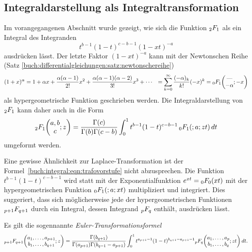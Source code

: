 %
%
\subsection{Integraldarstellung als Integraltransformation}
Im vorangegangenen Abschnitt wurde gezeigt, wie sich die Funktion
$\mathstrut_2F_1$ als ein Integral des Integranden
\[
t^{b-1}(1-t)^{c-b-1} (1-xt)^{-a}
\]
ausdrücken lässt.
Der letzte Faktor $(1-xt)^{-a}$ kann mit der
Newtonschen Reihe
(Satz \ref{buch:differentialgleichungen:satz:newtonschereihe})
\begin{align*}
(1+x)^\alpha
&=
1
+ 
\alpha x
+
\frac{\alpha(\alpha-1)}{2!}x^2
+
\frac{\alpha(\alpha-1)(\alpha-2)}{3!}x^3
+
\cdots
&=
\sum_{k=0}^\infty \frac{(-\alpha)_k}{k!} (-x)^k
=
\mathstrut_0F_1\biggl(
\begin{matrix}
\text{---}\\-\alpha
\end{matrix}
;-x
\biggr)
\end{align*}
als hypergeometrische Funktion geschrieben werden.
Die Integraldarstellung von $\mathstrut_2F_1$ kann daher auch 
in die Form
\begin{equation}
\mathstrut_2F_1\biggl(\begin{matrix}a,b\\c\end{matrix};z\biggr)
=
\frac{\Gamma(c)}{\Gamma(b)\Gamma(c-b)}
\int_0^1 t^{b-1}(1-t)^{c-b-1}
\,
\mathstrut_0F_1(;a;zt)\,dt
\label{buch:integral:eqn:trafovorstufe}
\end{equation}
umgeformt werden.

Eine gewisse Ähnlichkeit zur Laplace-Transformation ist der
Formel~\eqref{buch:integral:eqn:trafovorstufe} nicht abzusprechen.
Die Funktion \( t^{b-1}(1-t)^{c-b-1} \) wird statt mit der
Exponentialfunktion $e^{xt} = \mathstrut_0F_0(xt)$ mit der
hypergeometrischen Funktion $\mathstrut_0F_1(;a;xt)$ multipliziert und
integriert.
Dies suggeriert, dass sich möglicherweise jede der hypergeometrischen
Funktionen $\mathstrut_{p+1}F_{q+1}$ durch ein Integral, dessen 
Integrand $\mathstrut_pF_q$ enthält, ausdrücken lässt.

\begin{satz}
%
Es gilt die sogennannte {\em Euler-Transformationsformel}
%
\[
\mathstrut_{p+1}F_{q+1}\biggl(
\begin{matrix}
a_1,\dots,a_{p+1}\\
b_1,\dots,b_{q+1}
\end{matrix}
;z
\biggr)
=
\frac{\Gamma(b_{q+1})}{\Gamma(a_{p+1})\Gamma(b_{q-1}-a_{p+1})}
\int_0^1
t^{a_{p+1}-1}(1-t)^{b_{q+1}-a_{p+1}-1}
\mathstrut_pF_q\biggl(
\begin{matrix}
a_1,\dots,a_p\\
b_1,\dots,b_q
\end{matrix};zt
\biggr)
\,dt.
\]
\end{satz}

